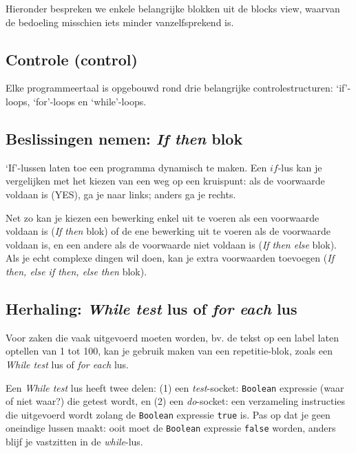 Hieronder bespreken we enkele belangrijke blokken uit de blocks view, waarvan de bedoeling misschien iets minder vanzelfsprekend is.

\subsection{Controle (control)}
Elke programmeertaal is opgebouwd rond drie belangrijke controlestructuren: \textquoteleft if\textquoteright-loops, \textquoteleft for\textquoteright-loops en \textquoteleft while\textquoteright-loops.

\subsection{Beslissingen nemen: \emph{If then} blok}

\begin{minipage}{.5\linewidth}
\end{minipage}
\begin{minipage}{.5\linewidth}
\end{minipage}

\textquoteleft If\textquoteright-lussen laten toe een programma dynamisch te maken. Een $if$-lus kan je vergelijken met het kiezen van een weg op een kruispunt: als de voorwaarde voldaan is (YES), ga je naar links; anders ga je rechts. 

Net zo kan je kiezen een bewerking enkel uit te voeren als een voorwaarde voldaan is (\emph{If then} blok) of de ene bewerking uit te voeren als de voorwaarde voldaan is, en een andere als de voorwaarde niet voldaan is (\emph{If then else} blok). Als je echt complexe dingen wil doen, kan je extra voorwaarden toevoegen (\emph{If then, else if then, else then} blok).

\subsection{Herhaling: \emph{While test} lus of \emph{for each} lus}

Voor zaken die vaak uitgevoerd moeten worden, bv. de tekst op een label laten optellen van 1 tot 100, kan je gebruik maken van een repetitie-blok, zoals een \emph{While test} lus of \emph{for each} lus.


Een \emph{While test} lus heeft twee delen: (1) een \emph{test}-socket: \texttt{Boolean} expressie (waar of niet waar?) die getest wordt, en (2) een \emph{do}-socket: een verzameling instructies die uitgevoerd wordt zolang de \texttt{Boolean} expressie \texttt{true} is. Pas op dat je geen oneindige lussen maakt: ooit moet de \texttt{Boolean} expressie \texttt{false} worden, anders blijf je vastzitten in de \emph{while}-lus.

